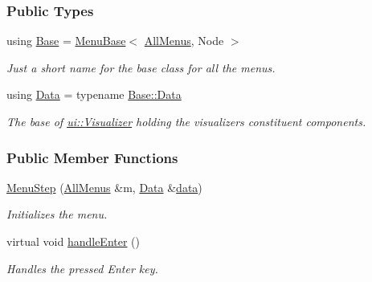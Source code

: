 \subsubsection*{Public Types}
\begin{DoxyCompactItemize}
\item 
using \hyperlink{structslb_1_1core_1_1ui_1_1MenuStep_ae76d03b2dce4ca88f8ff2a6a50213022}{Base} = \hyperlink{structslb_1_1core_1_1ui_1_1MenuBase}{Menu\+Base}$<$ \hyperlink{structslb_1_1core_1_1ui_1_1AllMenus}{All\+Menus}, Node $>$\hypertarget{structslb_1_1core_1_1ui_1_1MenuStep_ae76d03b2dce4ca88f8ff2a6a50213022}{}\label{structslb_1_1core_1_1ui_1_1MenuStep_ae76d03b2dce4ca88f8ff2a6a50213022}

\begin{DoxyCompactList}\small\item\em Just a short name for the base class for all the menus. \end{DoxyCompactList}\item 
using \hyperlink{structslb_1_1core_1_1ui_1_1MenuStep_ad1ad5d0fc8692062bc5f3037d337e696}{Data} = typename \hyperlink{structslb_1_1core_1_1ui_1_1MenuBase_a1803444111552d2e5b87671292dd74cb}{Base\+::\+Data}\hypertarget{structslb_1_1core_1_1ui_1_1MenuStep_ad1ad5d0fc8692062bc5f3037d337e696}{}\label{structslb_1_1core_1_1ui_1_1MenuStep_ad1ad5d0fc8692062bc5f3037d337e696}

\begin{DoxyCompactList}\small\item\em The base of \hyperlink{structslb_1_1core_1_1ui_1_1Visualizer}{ui\+::\+Visualizer} holding the visualizer\textquotesingle{}s constituent components. \end{DoxyCompactList}\end{DoxyCompactItemize}
\subsubsection*{Public Member Functions}
\begin{DoxyCompactItemize}
\item 
\hyperlink{structslb_1_1core_1_1ui_1_1MenuStep_aa69ffbea7d4c04fd4a0d164b7ca18354}{Menu\+Step} (\hyperlink{structslb_1_1core_1_1ui_1_1AllMenus}{All\+Menus} \&m, \hyperlink{structslb_1_1core_1_1ui_1_1MenuBase_a1803444111552d2e5b87671292dd74cb}{Data} \&\hyperlink{structslb_1_1core_1_1ui_1_1MenuBase_a475d9457affb2b4fc96737e269d6911f}{data})
\begin{DoxyCompactList}\small\item\em Initializes the menu. \end{DoxyCompactList}\item 
virtual void \hyperlink{structslb_1_1core_1_1ui_1_1MenuStep_a9a4e9ce044d5b839707898d930610553}{handle\+Enter} ()\hypertarget{structslb_1_1core_1_1ui_1_1MenuStep_a9a4e9ce044d5b839707898d930610553}{}\label{structslb_1_1core_1_1ui_1_1MenuStep_a9a4e9ce044d5b839707898d930610553}

\begin{DoxyCompactList}\small\item\em Handles the pressed Enter key. \end{DoxyCompactList}\end{DoxyCompactItemize}
